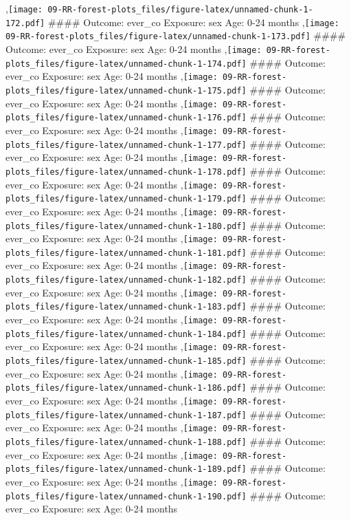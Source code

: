 \documentclass[
  9pt,
]{book}
\begin{document}
,\texttt{[image: 09-RR-forest-plots\_files/figure-latex/unnamed-chunk-1-172.pdf]}
\#\#\#\# Outcome: ever\_co Exposure: sex Age: 0-24 months
,\texttt{[image: 09-RR-forest-plots\_files/figure-latex/unnamed-chunk-1-173.pdf]}
\#\#\#\# Outcome: ever\_co Exposure: sex Age: 0-24 months
,\texttt{[image: 09-RR-forest-plots\_files/figure-latex/unnamed-chunk-1-174.pdf]}
\#\#\#\# Outcome: ever\_co Exposure: sex Age: 0-24 months
,\texttt{[image: 09-RR-forest-plots\_files/figure-latex/unnamed-chunk-1-175.pdf]}
\#\#\#\# Outcome: ever\_co Exposure: sex Age: 0-24 months
,\texttt{[image: 09-RR-forest-plots\_files/figure-latex/unnamed-chunk-1-176.pdf]}
\#\#\#\# Outcome: ever\_co Exposure: sex Age: 0-24 months
,\texttt{[image: 09-RR-forest-plots\_files/figure-latex/unnamed-chunk-1-177.pdf]}
\#\#\#\# Outcome: ever\_co Exposure: sex Age: 0-24 months
,\texttt{[image: 09-RR-forest-plots\_files/figure-latex/unnamed-chunk-1-178.pdf]}
\#\#\#\# Outcome: ever\_co Exposure: sex Age: 0-24 months
,\texttt{[image: 09-RR-forest-plots\_files/figure-latex/unnamed-chunk-1-179.pdf]}
\#\#\#\# Outcome: ever\_co Exposure: sex Age: 0-24 months
,\texttt{[image: 09-RR-forest-plots\_files/figure-latex/unnamed-chunk-1-180.pdf]}
\#\#\#\# Outcome: ever\_co Exposure: sex Age: 0-24 months
,\texttt{[image: 09-RR-forest-plots\_files/figure-latex/unnamed-chunk-1-181.pdf]}
\#\#\#\# Outcome: ever\_co Exposure: sex Age: 0-24 months
,\texttt{[image: 09-RR-forest-plots\_files/figure-latex/unnamed-chunk-1-182.pdf]}
\#\#\#\# Outcome: ever\_co Exposure: sex Age: 0-24 months
,\texttt{[image: 09-RR-forest-plots\_files/figure-latex/unnamed-chunk-1-183.pdf]}
\#\#\#\# Outcome: ever\_co Exposure: sex Age: 0-24 months
,\texttt{[image: 09-RR-forest-plots\_files/figure-latex/unnamed-chunk-1-184.pdf]}
\#\#\#\# Outcome: ever\_co Exposure: sex Age: 0-24 months
,\texttt{[image: 09-RR-forest-plots\_files/figure-latex/unnamed-chunk-1-185.pdf]}
\#\#\#\# Outcome: ever\_co Exposure: sex Age: 0-24 months
,\texttt{[image: 09-RR-forest-plots\_files/figure-latex/unnamed-chunk-1-186.pdf]}
\#\#\#\# Outcome: ever\_co Exposure: sex Age: 0-24 months
,\texttt{[image: 09-RR-forest-plots\_files/figure-latex/unnamed-chunk-1-187.pdf]}
\#\#\#\# Outcome: ever\_co Exposure: sex Age: 0-24 months
,\texttt{[image: 09-RR-forest-plots\_files/figure-latex/unnamed-chunk-1-188.pdf]}
\#\#\#\# Outcome: ever\_co Exposure: sex Age: 0-24 months
,\texttt{[image: 09-RR-forest-plots\_files/figure-latex/unnamed-chunk-1-189.pdf]}
\#\#\#\# Outcome: ever\_co Exposure: sex Age: 0-24 months
,\texttt{[image: 09-RR-forest-plots\_files/figure-latex/unnamed-chunk-1-190.pdf]}
\#\#\#\# Outcome: ever\_co Exposure: sex Age: 0-24 months
\end{document}
